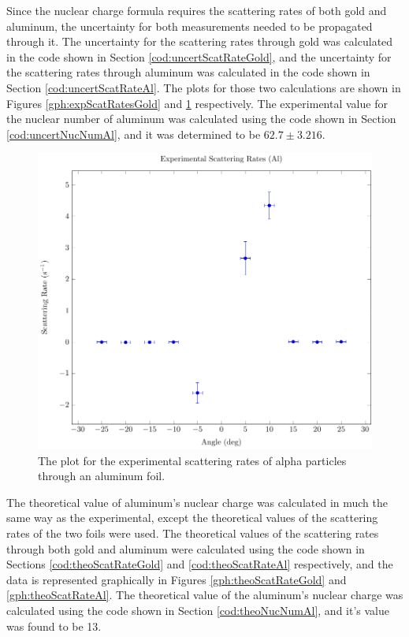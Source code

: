 \documentclass[a4paper]{article}
\begin{document}
\qq 

\qq Since the nuclear charge formula requires the scattering rates of both gold
and aluminum, the uncertainty for both measurements needed to be propagated
through it. The uncertainty for the scattering rates through gold was calculated
in the code shown in Section \ref{cod:uncertScatRateGold}, and the uncertainty
for the scattering rates through aluminum was calculated in the code shown in
Section \ref{cod:uncertScatRateAl}. The plots for those two calculations are
shown in Figures \ref{gph:expScatRatesGold} and \ref{gph:expScatRatesAl}
respectively. The experimental value for the nuclear number of aluminum was
calculated using the code shown in Section \ref{cod:uncertNucNumAl}, and it was
determined to be \( 62.7 \pm 3.216 \). 

\begin{figure}[H]
  \begin{center}
    \includegraphics[scale=0.8]{Plots/ExperimentalScatteringRatesAl/expScatRatesAl.pdf}
  \end{center}
  \caption{The plot for the experimental scattering rates of alpha particles
    through an aluminum foil.}
  \label{gph:expScatRatesAl}
\end{figure}

\qq 

\qq The theoretical value of aluminum's nuclear charge was calculated in much
the same way as the experimental, except the theoretical values of the
scattering rates of the two foils were used. The theoretical values of the
scattering rates through both gold and aluminum were calculated using the code
shown in Sections \ref{cod:theoScatRateGold} and \ref{cod:theoScatRateAl}
respectively, and the data is represented graphically in Figures
\ref{gph:theoScatRateGold} and \ref{gph:theoScatRateAl}. The theoretical value
of the aluminum's nuclear charge was calculated using the code shown in Section
\ref{cod:theoNucNumAl}, and it's value was found to be 13.
\end{document}
